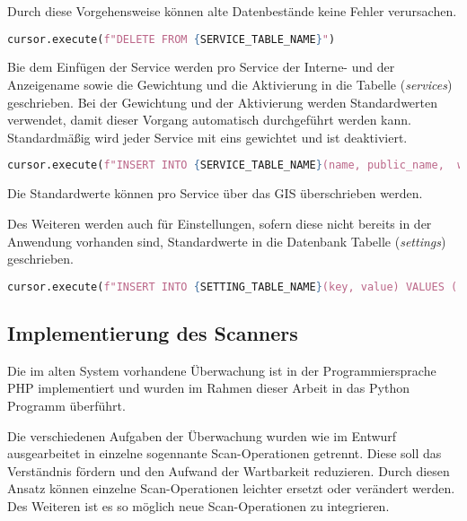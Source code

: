 Durch diese Vorgehensweise können alte Datenbestände keine Fehler verursachen.

\begin{lstlisting}[language=Python, frame=single, caption={Löschen der Services}, captionpos=b, label={lst:bigbrother-delete-service}]
cursor.execute(f"DELETE FROM {SERVICE_TABLE_NAME}")	
\end{lstlisting}

Bie dem Einfügen der Service werden pro Service der Interne- und der Anzeigename sowie die Gewichtung und die Aktivierung in die Tabelle (\textit{services}) geschrieben. Bei der Gewichtung und der Aktivierung werden Standardwerten verwendet, damit dieser Vorgang automatisch durchgeführt werden kann. Standardmäßig wird jeder Service mit eins gewichtet und ist deaktiviert.

\begin{lstlisting}[language=Python, frame=single, caption={Einfügen eines Services}, captionpos=b, label={lst:bigbrother-create-service}]
cursor.execute(f"INSERT INTO {SERVICE_TABLE_NAME}(name, public_name,  weight,  active) VALUES ('{name}', '{public_name}', 1, FALSE);")
\end{lstlisting}

Die Standardwerte können pro Service über das GIS überschrieben werden.

Des Weiteren werden auch für Einstellungen, sofern diese nicht bereits in der Anwendung vorhanden sind, Standardwerte in die Datenbank Tabelle (\textit{settings}) geschrieben.

\begin{lstlisting}[language=Python, frame=single, caption={Einfügen einer Einstellung}, captionpos=b, label={lst:bigbrother-create-settings}]
cursor.execute(f"INSERT INTO {SETTING_TABLE_NAME}(key, value) VALUES ('{default_value[0]}', '{default_value[1]}') ON CONFLICT (key) DO NOTHING;")
\end{lstlisting}


\subsection{Implementierung des Scanners}
Die im alten System vorhandene Überwachung ist in der Programmiersprache PHP implementiert und wurden im Rahmen dieser Arbeit in das Python Programm überführt.

Die verschiedenen Aufgaben der Überwachung wurden wie im Entwurf ausgearbeitet in einzelne sogennante Scan-Operationen getrennt. Diese soll das Verständnis fördern und den Aufwand der Wartbarkeit reduzieren. Durch diesen Ansatz können einzelne Scan-Operationen leichter ersetzt oder verändert werden. Des Weiteren ist es so möglich neue Scan-Operationen zu integrieren.

